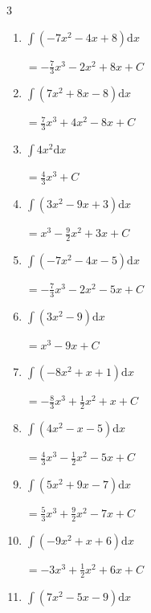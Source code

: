 \begin{multicols}{3}
\begin{enumerate}
  \item $\displaystyle \int \left( -7x^{2}-4x+8 \right) \mathrm{d}x$

        $\displaystyle =-\frac{7}{3}x^{3}-2x^{2}+8x+ C$

  \item $\displaystyle \int \left( 7x^{2}+8x-8 \right) \mathrm{d}x$

        $\displaystyle =\frac{7}{3}x^{3}+4x^{2}-8x+ C$

  \item $\displaystyle \int 4x^{2} \mathrm{d}x$

        $\displaystyle =\frac{4}{3}x^{3}+ C$

  \item $\displaystyle \int \left( 3x^{2}-9x+3 \right) \mathrm{d}x$

        $\displaystyle =x^{3}-\frac{9}{2}x^{2}+3x+ C$

  \item $\displaystyle \int \left( -7x^{2}-4x-5 \right) \mathrm{d}x$

        $\displaystyle =-\frac{7}{3}x^{3}-2x^{2}-5x+ C$

  \item $\displaystyle \int \left( 3x^{2}-9 \right) \mathrm{d}x$

        $\displaystyle =x^{3}-9x+ C$

  \item $\displaystyle \int \left( -8x^{2}+x+1 \right) \mathrm{d}x$

        $\displaystyle =-\frac{8}{3}x^{3}+\frac{1}{2}x^{2}+x+ C$

  \item $\displaystyle \int \left( 4x^{2}-x-5 \right) \mathrm{d}x$

        $\displaystyle =\frac{4}{3}x^{3}-\frac{1}{2}x^{2}-5x+ C$

  \item $\displaystyle \int \left( 5x^{2}+9x-7 \right) \mathrm{d}x$

        $\displaystyle =\frac{5}{3}x^{3}+\frac{9}{2}x^{2}-7x+ C$

\columnbreak %

  \item $\displaystyle \int \left( -9x^{2}+x+6 \right) \mathrm{d}x$

        $\displaystyle =-3x^{3}+\frac{1}{2}x^{2}+6x+ C$

  \item $\displaystyle \int \left( 7x^{2}-5x-9 \right) \mathrm{d}x$


\end{enumerate}
\end{multicols}
